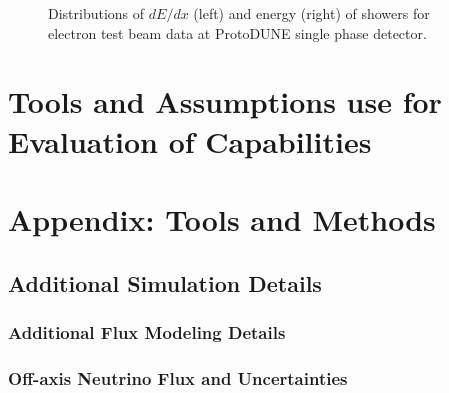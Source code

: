 \begin{figure}[!ht]
\centering
\subfloat[]{\label{fig:pandora_protodune_showers_dEdx_e}
}
\subfloat[]{\label{fig:pandora_protodune_showers_E_e}
}
\caption[Distributions of $dE/dx$, energy and angle between true and reconstructed directions for $e^-$s and $\gamma$s????]{
Distributions of $dE/dx$ (left) and energy (right) of showers for electron test beam data at ProtoDUNE single phase detector. }
\label{fig:pandora_protodune_showers}
\end{figure}

\clearpage




\clearpage
\section{Tools and Assumptions use for Evaluation of  Capabilities}
\label{sec:tools-nd-eval}


\section{Appendix: Tools and Methods}
\label{sec:tools-appendix}

\subsection{Additional Simulation Details}

\subsubsection{Additional Flux Modeling Details}
\label{sec:tools-app-flx}

\subsubsection{Off-axis Neutrino Flux and Uncertainties}
\label{sec:tools-app-flx-offaxis}

